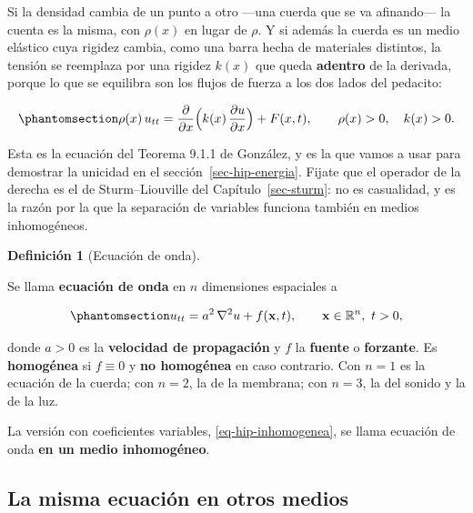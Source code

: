\documentclass[
  spanish,
  a4paper,
]{scrbook}
\theoremstyle{definition}
\newtheorem{definition}{Definición}[chapter]
\theoremstyle{plain}
\theoremstyle{definition}
\theoremstyle{plain}
\theoremstyle{definition}
\theoremstyle{remark}
\begin{document}
Si la densidad cambia de un punto a otro ---una cuerda que se va
afinando--- la cuenta es la misma, con \(\rho(x)\) en lugar de \(\rho\).
Y si además la cuerda es un medio elástico cuya rigidez cambia, como una
barra hecha de materiales distintos, la tensión se reemplaza por una
rigidez \(k(x)\) que queda \textbf{adentro} de la derivada, porque lo
que se equilibra son los flujos de fuerza a los dos lados del pedacito:

\begin{equation}\protect\phantomsection\label{eq-hip-inhomogenea}{
\rho(x)\,u_{tt} = \frac{\partial}{\partial x}\Big(k(x)\,\frac{\partial u}{\partial x}\Big) + F(x,t),
\qquad \rho(x)>0,\quad k(x)>0 .
}\end{equation}

Esta es la ecuación del Teorema 9.1.1 de González, y es la que vamos a
usar para demostrar la unicidad en el sección~\ref{sec-hip-energia}.
Fijate que el operador de la derecha es el de Sturm--Liouville del
Capítulo~\ref{sec-sturm}: no es casualidad, y es la razón por la que la
separación de variables funciona también en medios inhomogéneos.

\begin{definition}[Ecuación de
onda]\protect\hypertarget{def-hip-onda}{}\label{def-hip-onda}

Se llama \textbf{ecuación de onda} en \(n\) dimensiones espaciales a

\begin{equation}\protect\phantomsection\label{eq-hip-onda-n}{
u_{tt} = a^2\,\nabla^2 u + f(\mathbf{x},t), \qquad \mathbf{x}\in\mathbb{R}^n,\ t>0,
}\end{equation}

donde \(a>0\) es la \textbf{velocidad de propagación} y \(f\) la
\textbf{fuente} o \textbf{forzante}. Es \textbf{homogénea} si
\(f\equiv0\) y \textbf{no homogénea} en caso contrario. Con \(n=1\) es
la ecuación de la cuerda; con \(n=2\), la de la membrana; con \(n=3\),
la del sonido y la de la luz.

La versión con coeficientes variables, \ref{eq-hip-inhomogenea}, se
llama ecuación de onda \textbf{en un medio inhomogéneo}.

\end{definition}

\subsection{La misma ecuación en otros medios}\label{sec-hip-analogias}
\end{document}
